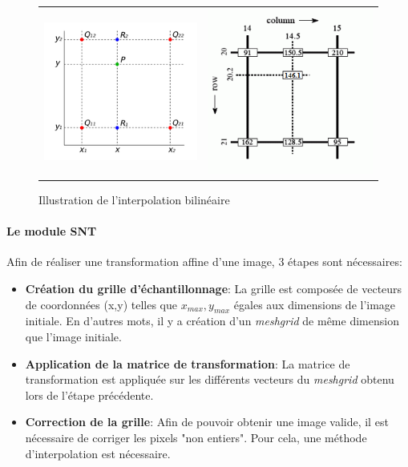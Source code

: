 \begin{figure}
    \centering
    \begin{tabular}{cc}
    \includegraphics[scale=0.4]{./tex/attention-deep-learning/bilineaire.png} & \includegraphics[scale=0.4]{./tex/attention-deep-learning/Bilin3.png} \\
    \end{tabular}
    \caption{Illustration de l'interpolation bilinéaire}
    \label{bilineaire}
\end{figure}

\paragraph{Le module SNT}
Afin de réaliser une transformation affine d'une image, 3 étapes sont nécessaires:
\begin{itemize}
    \item \textbf{Création du grille d'échantillonnage}: La grille est composée de vecteurs de coordonnées (x,y) telles que $x_{max},y_{max}$ égales aux dimensions de l'image initiale. En d'autres mots, il y a création d'un \textit{meshgrid} de même dimension que l'image initiale.
    \item \textbf{Application de la matrice de transformation}: La matrice de transformation est appliquée sur les différents vecteurs du \textit{meshgrid} obtenu lors de l'étape précédente.
    \item \textbf{Correction de la grille}: Afin de pouvoir obtenir une image valide, il est nécessaire de corriger les pixels "non entiers". Pour cela, une méthode d'interpolation est nécessaire.
\end{itemize}

